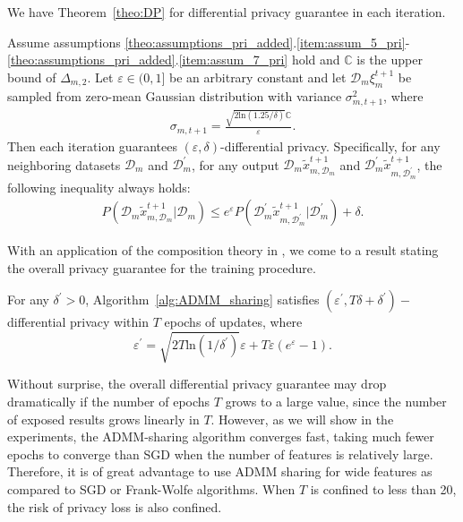We have Theorem~\ref{theo:DP} for differential privacy guarantee in each iteration.
\begin{theorem}\label{theo:DP}
  Assume assumptions \ref{theo:assumptions_pri_added}.\ref{item:assum_5_pri}-\ref{theo:assumptions_pri_added}.\ref{item:assum_7_pri} hold and $\mathbb{C}$ is the 
  upper bound of $\Delta_{m,2}$. Let $\varepsilon\in(0,1]$ be an arbitrary constant and let
  $\mathcal{D}_m\xi_m^{t+1}$ be sampled from zero-mean Gaussian distribution with variance $\sigma_{m,t+1}^2$,
  where
  \begin{eqnarray*}
    \sigma_{m,t+1}=\frac{\sqrt{2\text{ln}(1.25/\delta)}\mathbb{C}}{\varepsilon}.
  \end{eqnarray*}
  Then each iteration guarantees $(\varepsilon,\delta)$-differential privacy. Specifically,
  for any neighboring datasets $\mathcal{D}_m$ and $\mathcal{D}_m^{\prime}$, for any output
  $\mathcal{D}_m\tilde{x}_{m,\mathcal{D}_m}^{t+1}$ and $\mathcal{D}_m^{\prime}\tilde{x}_{m,\mathcal{D}_m^{\prime}}^{t+1}$, the following inequality always holds:
  \begin{eqnarray*}
    P(\mathcal{D}_m\tilde{x}_{m,\mathcal{D}_m}^{t+1}|\mathcal{D}_m)\leq e^{\varepsilon}
    P(\mathcal{D}_m^{\prime}\tilde{x}_{m,\mathcal{D}_m^{\prime}}^{t+1}|\mathcal{D}_m^{\prime})
    +\delta.
  \end{eqnarray*}
\end{theorem}

With an application of the composition theory in \cite{dwork2014algorithmic}, we come to a result stating the overall privacy guarantee for the training procedure.
\begin{coro}\label{theorem:overall_privacy}
  For any $\delta^{\prime}>0$, Algorithm~\ref{alg:ADMM_sharing} satisfies $(\varepsilon^{\prime}, T\delta+\delta^{\prime})-$differential privacy within $T$ epochs of updates, where
  \begin{equation}
    \varepsilon^{\prime}=\sqrt{2T\text{ln}(1/\delta^{\prime})}\varepsilon+T\varepsilon(e^\varepsilon - 1).
  \end{equation}
\end{coro}

Without surprise, the overall differential privacy guarantee may drop dramatically if the number of epochs $T$ grows to a large value, since the number of exposed results grows linearly in $T$. However, as we will show in the experiments, the ADMM-sharing algorithm converges fast, taking much fewer epochs to converge than SGD when the number of features is relatively large. Therefore, it is of great advantage to use ADMM sharing for wide features as compared to SGD or Frank-Wolfe algorithms. When $T$ is confined to less than 20, the risk of privacy loss is also confined.


